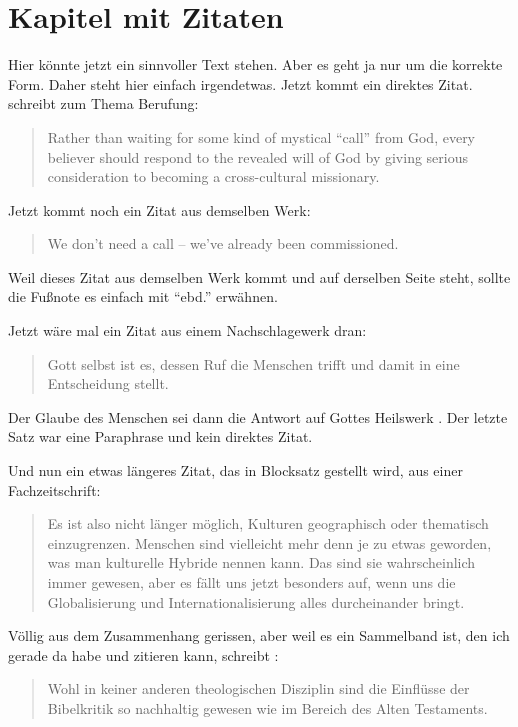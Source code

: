 \documentclass{scrreport}
\begin{document}

\chapter{Kapitel mit Zitaten}
Hier könnte jetzt ein sinnvoller Text stehen. Aber es geht ja nur um die korrekte Form. Daher steht hier einfach irgendetwas. Jetzt kommt ein direktes Zitat. \citeauthor*{friesen} schreibt zum Thema Berufung: \blockcquote[][330]{friesen}{Rather than waiting for some kind of mystical \enquote{call} from God, every believer should respond to the revealed will of God by giving serious consideration to becoming a cross-cultural missionary.} Jetzt kommt noch ein Zitat aus demselben Werk: \blockcquote[][330]{friesen}{We don't need a call -- we've already been commissioned.} Weil dieses Zitat aus demselben Werk kommt und auf derselben Seite steht, sollte die Fußnote es einfach mit \enquote{ebd.} erwähnen.

Jetzt wäre mal ein Zitat aus einem Nachschlagewerk dran: \blockcquote[][80]{rienecker}{Gott selbst ist es, dessen Ruf die Menschen trifft und damit in eine Entscheidung stellt.} Der Glaube des Menschen sei dann die Antwort auf Gottes Heilswerk \autocite[Vgl.][]{rienecker}. Der letzte Satz war eine Paraphrase und kein direktes Zitat.

Und nun ein etwas längeres Zitat, das in Blocksatz gestellt wird, aus einer Fachzeitschrift: \blockcquote[][]{dahl}{Es ist also nicht länger möglich, Kulturen geographisch oder thematisch einzugrenzen. Menschen sind vielleicht mehr denn je zu etwas geworden, was man kulturelle Hybride nennen kann. Das sind sie wahrscheinlich immer gewesen, aber es fällt uns jetzt besonders auf, wenn uns die Globalisierung und Internationalisierung alles durch\-einander bringt.}

Völlig aus dem Zusammenhang gerissen, aber weil es ein Sammelband ist, den ich gerade da habe und zitieren kann, schreibt \citeauthor*{hilbrands}: \blockcquote[][49]{hilbrands}{Wohl in keiner anderen theologischen Disziplin sind die Einflüsse der Bibelkritik so nachhaltig gewesen wie im Bereich des Alten Testaments.}
\end{document}
